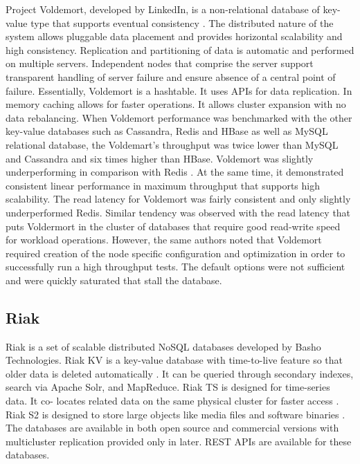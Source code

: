 {     Project Voldemort, developed
     by LinkedIn, is a non-relational database of key-value type that
     supports eventual consistency \cite{www-voldemort}.
     The distributed nature of the
     system allows pluggable data placement and provides horizontal
     scalability and high consistency. Replication and partitioning of
     data is automatic and performed on multiple servers. Independent
     nodes that comprise the server support transparent handling of
     server failure and ensure absence of a central point of
     failure. Essentially, Voldemort is a hashtable. It uses APIs for
     data replication. In memory caching allows for faster
     operations. It allows cluster expansion with no data rebalancing.
     When Voldemort performance was benchmarked with the other
     key-value databases such as Cassandra, Redis and HBase as well as
     MySQL relational database, the
     Voldemart's throughput was twice lower than MySQL and Cassandra
     and six times higher than HBase. Voldemort was slightly
     underperforming in comparison with Redis \cite{rabl-sadoghi-jacobsen-2012}.
     At the same time, it
     demonstrated consistent linear performance in maximum throughput
     that supports high scalability. The read latency for Voldemort
     was fairly consistent and only slightly underperformed
     Redis. Similar tendency was observed with the read latency that
     puts Voldermort in the cluster of databases that require good
     read-write speed for workload operations. However, the same
     authors noted that Voldemort required creation of the node
     specific configuration and optimization in order to successfully
     run a high throughput tests. The default options were not
     sufficient and were quickly saturated that stall the database.

     \pv
     
\subsection{Riak}

     Riak is a set of scalable distributed NoSQL databases developed
     by Basho Technologies. Riak KV is a key-value
     database with time-to-live feature so that older data is deleted
     automatically \cite{www-riak-kv}.  It can be queried through secondary indexes,
     search via Apache Solr, and MapReduce. Riak TS is designed for
     time-series data. It co- locates related data on the same
     physical cluster for faster access \cite{www-riak-ts}. Riak S2
     is designed to store large objects like media files and software
     binaries \cite{www-riak-s2}. The databases are available in both
     open source and commercial versions with multicluster replication
     provided only in later. REST APIs are available for these
     databases.

}
